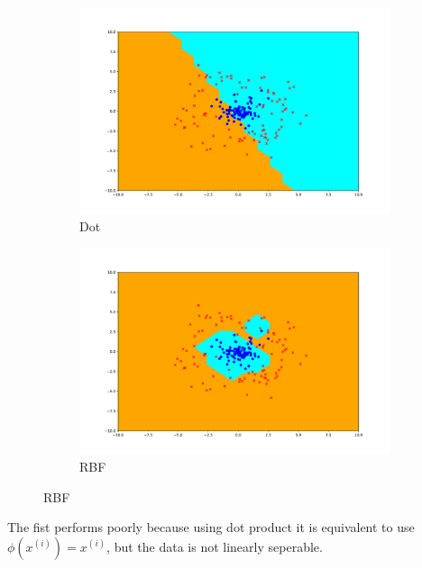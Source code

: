 \begin{answer}
    \begin{figure}[htbp]
        \begin{subfigure}[b]{0.5\linewidth}
            \centering
            \includegraphics[width=\linewidth]{pics/p05_dot_output.pdf}
            \caption{Dot}
        \end{subfigure}
        \begin{subfigure}[b]{0.5\linewidth}
            \centering
            \includegraphics[width=\linewidth]{pics/p05_rbf_output.pdf}
            \caption{RBF}
        \end{subfigure}
    \end{figure}

    The fist performs poorly because using dot product it is equivalent to use $\phi(x^{(i)}) = x^{(i)}$, but the data is not linearly seperable.
\end{answer}
